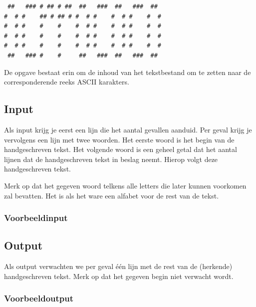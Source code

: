 \documentclass[a4paper]{article}
\begin{document}
\begin{verbatim}
 ##   ### # ## # ##  ##   ###  ##   ###  ##
#  # #    ## # ## # #  # #    #  # #    #  #
#  # #    #    #    #  # #    #  # #    #  #
#  # #    #    #    #  # #    #  # #    #  #
#  # #    #    #    #  # #    #  # #    #  #
 ##   ### #    #     ##   ###  ##   ###  ##
\end{verbatim}

De opgave bestaat erin om de inhoud van het tekstbestand om te zetten naar de
corresponderende reeks ASCII karakters.

\subsection*{Input}

Als input krijg je eerst een lijn die het aantal gevallen aanduid. Per geval
krijg je vervolgens een lijn met twee woorden. Het eerste woord is het begin van
de handgeschreven tekst. Het volgende woord is een geheel getal dat het aantal
lijnen dat de handgeschreven tekst in beslag neemt. Hierop volgt deze
handgeschreven tekst.

Merk op dat het gegeven woord telkens alle letters die later kunnen voorkomen
zal bevatten. Het is als het ware een alfabet voor de rest van de tekst.

\subsubsection*{Voorbeeldinput}



\subsection*{Output}

Als output verwachten we per geval \'e\'en lijn met de rest van de (herkende)
handgeschreven tekst. Merk op dat het gegeven begin niet verwacht wordt.

\subsubsection*{Voorbeeldoutput}


\end{document}
